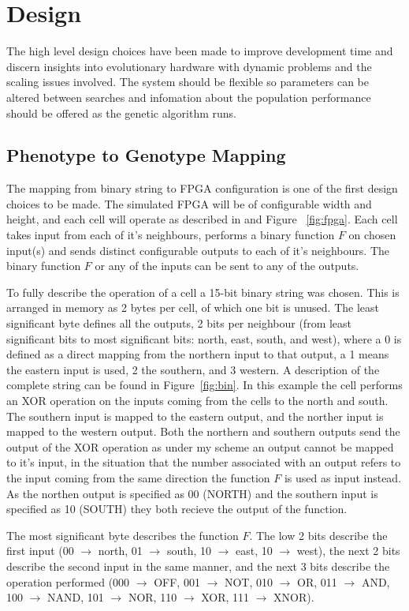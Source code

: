 \section{Design}
The high level design choices have been made to improve development time
and discern insights into evolutionary hardware with dynamic problems and
the scaling issues involved. The system should be flexible so parameters can
be altered between searches and infomation
about the population performance should be offered as the genetic algorithm runs.

\subsection{Phenotype to Genotype Mapping}
The mapping from binary string to FPGA configuration is one of the first design
choices to be made. The simulated FPGA will be of configurable width and height, and each
cell will operate as described in \cite{10.1007/3-540-63173-9_61} and Figure~
\ref{fig:fpga}. Each cell takes
input from each of it's neighbours, performs a binary function $F$ on chosen input(s)
and sends distinct configurable outputs to each of it's neighbours. The binary
function $F$ or any of the inputs can be sent to any of the outputs.

To fully describe the operation of a cell a 15-bit binary string was chosen.
This is arranged in memory as 2 bytes per cell, of which one bit is unused.
The least significant byte defines all the outputs, 2 bits per neighbour
(from least significant bits to most significant bits: north, east, south,
and west), where a 0 is defined as a direct mapping from the northern input
to that output, a 1 means the eastern input is used, 2 the southern, and 3
western.  A description of
the complete string can be found in Figure~\ref{fig:bin}. In this example
the cell performs an XOR operation on the inputs coming from the cells to
the north and south. The southern input is mapped to the eastern output,
and the norther input is mapped to the western output. Both the northern
and southern outputs send the output of the XOR operation as under my
scheme
an output cannot be mapped to it's input, in the situation that the
number associated with an output refers to the input coming from the same
direction the function $F$ is used as input instead. As the northen output
is specified as 00 (NORTH) and the southern input is specified as 10 (SOUTH)
they both recieve the output of the function.

The most significant byte describes the function $F$. The low 2 bits describe
the first input (00 $\rightarrow$ north, 01 $\rightarrow$ south, 10
$\rightarrow$ east, 10 $\rightarrow$ west), the next 2 bits describe the second
input in the same manner, and the next 3 bits describe the operation performed
(000 $\rightarrow$ OFF, 001 $\rightarrow$ NOT, 010 $\rightarrow$ OR, 011 $\rightarrow$
AND, 100 $\rightarrow$ NAND, 101 $\rightarrow$ NOR, 110 $\rightarrow$ XOR, 111
$\rightarrow$ XNOR).

